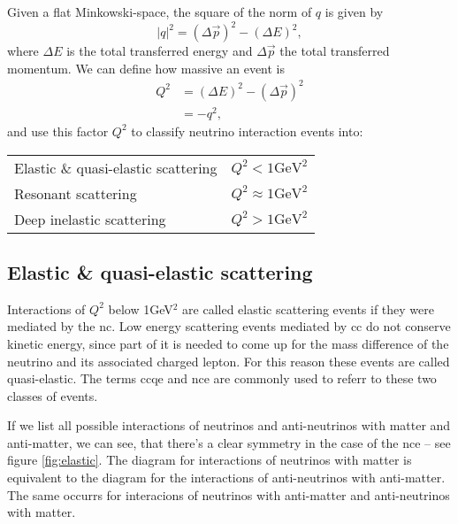 Given a flat Minkowski-space, the square of the norm of $q$ is given by
\begin{equation*}
  |q|^2 = (\Delta \vec{p})^2 - (\Delta E)^2,
\end{equation*}
where $\Delta E$ is the total transferred energy and $\Delta \vec{p}$ the total transferred momentum.
We can define how massive an event is
\begin{align*}
  Q^2 &= (\Delta E)^2 - (\Delta \vec{p})^2 \\
      &= -q^2,
\end{align*}
and use this factor $Q^2$ to classify neutrino interaction events into:\\
\begin{tabular}{ l c }
  Elastic \& quasi-elastic scattering  & $Q^2 < 1 \text{GeV}^2$ \\
  Resonant scattering                  & $Q^2 \approx 1 \text{GeV}^2$ \\
  Deep inelastic scattering            & $Q^2 > 1 \text{GeV}^2$ \\
\end{tabular}

\subsection{Elastic \& quasi-elastic scattering} 
Interactions of $Q^2$ below 1GeV$^2$ are called elastic scattering events if they were mediated by the \gls{nc}.
Low energy scattering events mediated by \gls{cc} do not conserve kinetic energy, since part of it is needed to come up for the mass difference of the neutrino and its associated charged lepton.
For this reason these events are called quasi-elastic.
The terms \gls{ccqe} and \gls{nce} are commonly used to referr to these two classes of events.

If we list all possible interactions of neutrinos and anti-neutrinos with matter and anti-matter, we can see, that there's a clear symmetry in the case of the \gls{nce} -- see figure \ref{fig:elastic}.
The diagram for interactions of neutrinos with matter is equivalent to the diagram for the interactions of anti-neutrinos with anti-matter.
The same occurrs for interacions of neutrinos with anti-matter and anti-neutrinos with matter.

